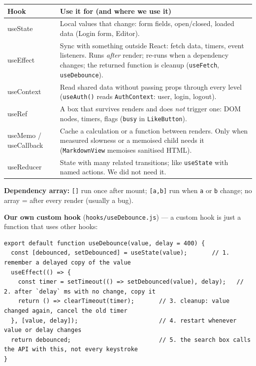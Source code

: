 \documentclass[10pt,a4paper]{article}
\newcommand{\code}[1]{\texttt{#1}}
\begin{document}
\begin{tabularx}{\linewidth}{@{}>{\ttfamily}l X@{}}
\toprule
\textbf{Hook} & \textbf{Use it for (and where we use it)} \\ \midrule
useState & Local values that change: form fields, open/closed, loaded data (Login form, Editor). \\
useEffect & Sync with something outside React: fetch data, timers, event listeners. Runs \emph{after} render; re-runs when a dependency changes; the returned function is cleanup (\code{useFetch}, \code{useDebounce}). \\
useContext & Read shared data without passing props through every level (\code{useAuth()} reads \code{AuthContext}: user, login, logout). \\
useRef & A box that survives renders and does \emph{not} trigger one: DOM nodes, timers, flags (\code{busy} in \code{LikeButton}). \\
useMemo / useCallback & Cache a calculation or a function between renders. Only when measured slowness or a memoised child needs it (\code{MarkdownView} memoises sanitised HTML). \\
useReducer & State with many related transitions; like \code{useState} with named actions. We did not need it. \\
\bottomrule
\end{tabularx}

\textbf{Dependency array:} \code{[]} run once after mount; \code{[a,b]} run when \code{a} or \code{b} change; no array = after every render (usually a bug).

\textbf{Our own custom hook} (\code{hooks/useDebounce.js}) --- a custom hook is just a function that uses other hooks:
\begin{lstlisting}[language=JS]
export default function useDebounce(value, delay = 400) {
  const [debounced, setDebounced] = useState(value);       // 1. remember a delayed copy of the value
  useEffect(() => {
    const timer = setTimeout(() => setDebounced(value), delay);   // 2. after `delay` ms with no change, copy it
    return () => clearTimeout(timer);       // 3. cleanup: value changed again, cancel the old timer
  }, [value, delay]);                       // 4. restart whenever value or delay changes
  return debounced;                         // 5. the search box calls the API with this, not every keystroke
}
\end{lstlisting}
\end{document}
